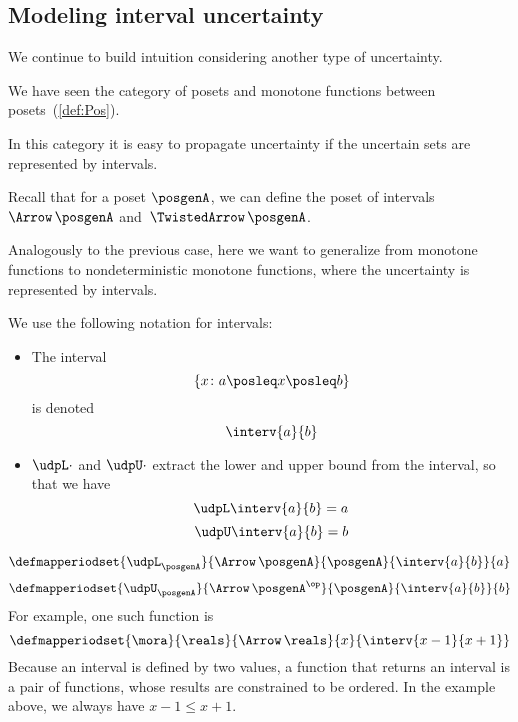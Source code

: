 \subsection{Modeling interval uncertainty}

We continue to build intuition considering another type of uncertainty.

We have seen the category \Pos of posets and monotone functions between posets~(\cref{def:Pos}).

In this category it is easy to propagate uncertainty if the uncertain sets are represented by intervals.

Recall that for a poset $\posgenA$, we can define the poset of intervals~$\Arrow\,\posgenA$
and~$\TwistedArrow\,\posgenA$.

Analogously to the previous case, here we want to generalize from monotone functions to nondeterministic monotone functions, where the uncertainty is represented by intervals.

We use the following notation for intervals:
\begin{itemize}
	\item The interval
	      \begin{equation}
		      \label{eq:interv-1}
		      \{x\colon a \posleq x \posleq b\}
	      \end{equation}
	      is denoted
	      \begin{equation}
		      \label{eq:interv-2}
		      \interv{a}{b}
	      \end{equation}
	\item $\udpL\cdot$ and $\udpU\cdot$ extract the lower and upper bound from the interval, so that we have
	      \begin{equation}
		      \label{eq:interv-L}
		      \udpL \interv{a}{b} = a
	      \end{equation}
	      \begin{equation}
		      \label{eq:interv-U}
		      \udpU \interv{a}{b} = b
	      \end{equation}
\end{itemize}
%
\begin{equation}
	\label{eq:interv-L-def}
	\defmapperiodset{\udpL_{\posgenA}}{\Arrow\,\posgenA}{\posgenA}%
	{\interv{a}{b}}{ a }
\end{equation}
%
\begin{equation}
	\label{eq:interv-U-def}
	\defmapperiodset{\udpU_{\posgenA}}{\Arrow\,\posgenA^{\op}}{\posgenA}%
	{\interv{a}{b}}{ b }
\end{equation}
%
For example, one such function is
%
\begin{equation}
	\label{eq:interval-func-example}
	\defmapperiodset{\mora}{\reals}{\Arrow\,\reals}%
	{x}{ \interv{x-1}{x+1}
	}
\end{equation}
Because an interval is defined by two values, a function that returns an interval is a pair of functions, whose results are constrained to be ordered.
In the example above, we always have $x-1\leq x+1$.

